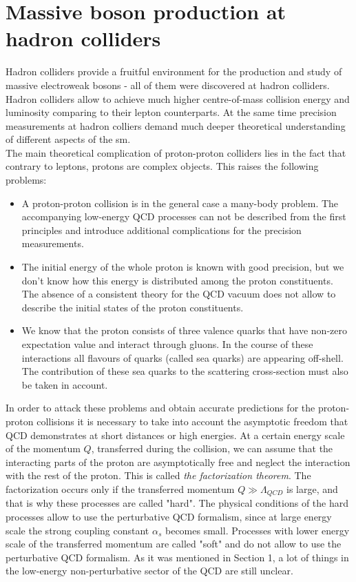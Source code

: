         \section{Massive boson production at hadron colliders}
		Hadron colliders provide a fruitful environment for the production and study of massive electroweak bosons - all of them were discovered at hadron colliders. Hadron colliders allow to achieve much higher centre-of-mass collision energy and luminosity comparing to their lepton counterparts. At the same time precision measurements at hadron colliers demand much deeper theoretical understanding of different aspects of the \gls{sm}. \\
		The main theoretical complication of proton-proton colliders lies in the fact that contrary to leptons, protons are complex objects. This raises the following problems:
		\begin{itemize}
		\item A proton-proton collision is in the general case a many-body problem. The accompanying low-energy QCD processes can not be described from the first principles and introduce additional complications for the precision measurements.
		\item The initial energy of the whole proton is known with good precision, but we don't know how this energy is distributed among the proton constituents. The absence of a consistent theory for the QCD vacuum does not allow to describe the initial states of the proton constituents.
		\item We know that the proton consists of three valence quarks that have non-zero expectation value and interact through gluons. In the course of these interactions all flavours of quarks (called sea quarks) are appearing off-shell. The contribution of these sea quarks to the scattering cross-section must also be taken in account.  
		\end{itemize}
		In order to attack these problems and obtain accurate predictions for the proton-proton collisions it is necessary to take into account the asymptotic freedom that QCD demonstrates at short distances or high energies. At a certain energy scale of the momentum $Q$, transferred during the collision, we can assume that the interacting parts of the proton are asymptotically free and neglect the interaction with the rest of the proton. This is called \textit{the factorization theorem}. The factorization occurs only if the transferred momentum $Q\gg \Lambda_{QCD}$ is large, and that is why these processes are called "hard". The physical conditions of the hard processes allow to use the perturbative QCD formalism, since at large energy scale the strong coupling constant $\alpha_s$ becomes small. Processes with lower energy scale of the transferred momentum are called "soft" and do not allow to use the perturbative QCD formalism. As it was mentioned in Section 1, a lot of things in the low-energy non-perturbative sector of the QCD are still unclear. \\
